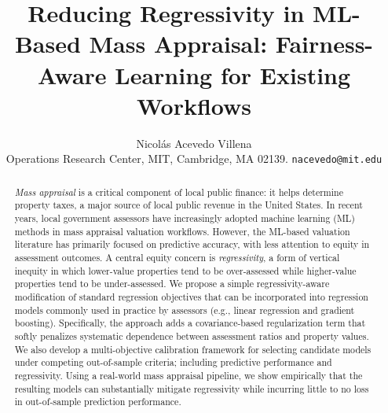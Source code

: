 \documentclass[12pt, draft]{article}
\title{\vspace{-5mm}Reducing Regressivity in ML-Based Mass Appraisal: Fairness-Aware Learning for Existing Workflows\vspace{0mm}}
\author{Nicolás Acevedo Villena\\
{\small Operations Research Center, MIT, Cambridge, MA 02139. \texttt{nacevedo@mit.edu}}}
\date{
\vspace{-8mm}
}
\theoremstyle{plain}
\theoremstyle{definition}
\newcommand{\1}{\mathbf{1}}
\begin{document}
\maketitle

\begin{abstract}


\textit{Mass appraisal} is a critical component of local public finance: it helps determine property taxes, a major source of local public revenue in the United States. In recent years, local government assessors have increasingly adopted machine learning (ML) methods in mass appraisal valuation workflows. However, the ML-based valuation literature has primarily focused on predictive accuracy, with less attention to equity in assessment outcomes. A central equity concern is \textit{regressivity}, a form of vertical inequity in which lower-value properties tend to be over-assessed while higher-value properties tend to be under-assessed. We propose a simple regressivity-aware modification of standard regression objectives that can be incorporated into regression models commonly used in practice by assessors (e.g., linear regression and gradient boosting). Specifically, the approach adds a covariance-based regularization term that softly penalizes systematic dependence between assessment ratios and property values. We also develop a multi-objective calibration framework for selecting candidate models under competing out-of-sample criteria; including predictive performance and regressivity. Using a real-world mass appraisal pipeline, we show empirically that the resulting models can substantially mitigate regressivity while incurring little to no loss in out-of-sample prediction performance.


\end{abstract}
\end{document}
